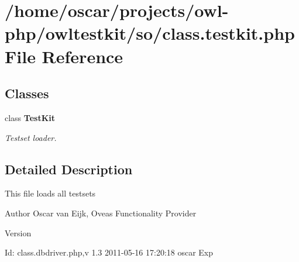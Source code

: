 \section{/home/oscar/projects/owl-\/php/owltestkit/so/class.testkit.php File Reference}
\label{class_8testkit_8php}
\subsection*{Classes}
\begin{DoxyCompactItemize}
\item 
class {\bf TestKit}
\begin{DoxyCompactList}\small\item\em Testset loader. \end{DoxyCompactList}\end{DoxyCompactItemize}


\subsection{Detailed Description}
This file loads all testsets \begin{DoxyAuthor}{Author}
Oscar van Eijk, Oveas Functionality Provider 
\end{DoxyAuthor}
\begin{DoxyVersion}{Version}

\end{DoxyVersion}
\begin{DoxyParagraph}{Id:}
class.dbdriver.php,v 1.3 2011-\/05-\/16 17:20:18 oscar Exp 
\end{DoxyParagraph}
